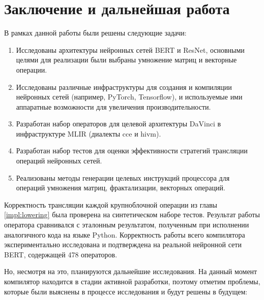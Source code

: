 \section{Заключение и дальнейшая работа}
\label{sec:Conclusion} 

В рамках данной работы были решены следующие задачи:

\begin{enumerate}
    \item Исследованы архитектуры нейронных сетей BERT и ResNet,
          основными целями для реализации были выбраны умножение матриц и
          векторные операции.
    \item Исследованы различные инфраструктуры для создания и компиляции
          нейронных сетей (например, PyTorch, Tensorflow), и используемые ими
          аппаратные возможности для увеличения производительности.
    \item Разработан набор операторов для целевой архитектуры DaVinci в
          инфраструктуре MLIR (диалекты cce и hivm).
    \item Разработан набор тестов для оценки эффективности стратегий трансляции
          операций нейронных сетей.
    \item Реализованы методы генерации целевых инструкций процессора
          для операций умножения матриц, фрактализации, векторных операций.
\end{enumerate}


Корректность трансляции каждой крупноблочной операции из главы
\ref{impl:lowering} была проверена на синтетическом наборе тестов. Результат
работы оператора сравнивался с эталонным результатом, полученным при исполнении
аналогичного кода на языке Python. Корректность работы всего компилятора
экспериментально исследована и подтверждена на реальной нейронной сети BERT,
содержащей 478 операторов.

Но, несмотря на это, планируются дальнейшие исследования.
На данный момент компилятор находится в стадии активной разработки, поэтому
отметим проблемы, которые были выяснены в процессе исследования и будут решены
в будущем:


